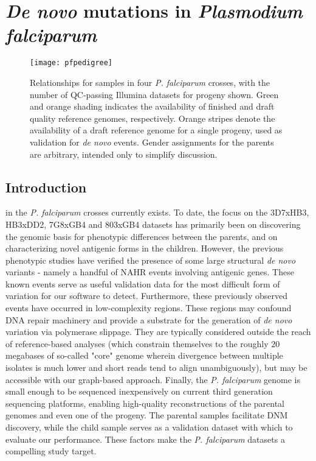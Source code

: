 \chapter{\textit{De novo} mutations in \textit{Plasmodium falciparum}}
\label{ch:pf}

\begin{figure}[h!]
  \centering
    \texttt{[image: pfpedigree]}
  \caption{Relationships for samples in four \textit{P. falciparum} crosses, with the number of QC-passing Illumina datasets for progeny shown.  Green and orange shading indicates the availability of finished and draft quality reference genomes, respectively.  Orange stripes denote the availability of a draft reference genome for a single progeny, used as validation for \textit{de novo} events.  Gender assignments for the parents are arbitrary, intended only to simplify discussion.}
  \label{fig:pfpedigree}
\end{figure}

\section{Introduction}

 in the \textit{P. falciparum} crosses currently exists.  To date, the focus on the 3D7xHB3, HB3xDD2, 7G8xGB4 and 803xGB4 datasets has primarily been on discovering the genomic basis for phenotypic differences between the parents, and on characterizing novel antigenic forms in the children.  However, the previous phenotypic studies have verified the presence of some large structural \textit{de novo} variants - namely a handful of NAHR events involving antigenic genes.  These known events serve as useful validation data for the most difficult form of variation for our software to detect.  Furthermore, these previously observed events have occurred in low-complexity regions.  These regions may confound DNA repair machinery and provide a substrate for the generation of \textit{de novo} variation via polymerase slippage\cite{Kloosterman:2015cn}.  They are typically considered outside the reach of reference-based analyses (which constrain themselves to the roughly $20$ megabases of so-called "core" genome wherein divergence between multiple isolates is much lower and short reads tend to align unambiguously\cite{Miles:2015in}), but may be accessible with our graph-based approach.  Finally, the \textit{P. falciparum} genome is small enough to be sequenced inexpensively on current third generation sequencing platforms, enabling high-quality reconstructions of the parental genomes and even one of the progeny.  The parental samples facilitate DNM discovery, while the child sample serves as a validation dataset with which to evaluate our performance.  These factors make the \textit{P. falciparum} datasets a compelling study target.


